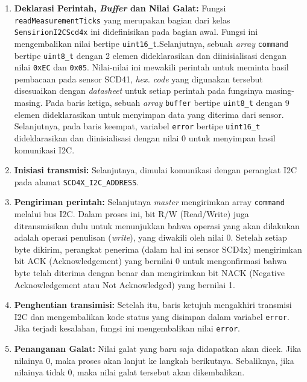         \begin{enumerate}
            \item \textbf{Deklarasi Perintah, \textit{Buffer }dan Nilai Galat:} Fungsi \texttt{readMeasurementTicks} yang merupakan bagian dari kelas  \texttt{SensirionI2CScd4x} ini didefinisikan pada bagian awal. Fungsi ini mengembalikan nilai bertipe \texttt{uint16\_t}.Selanjutnya, sebuah \textit{array} \texttt{command} bertipe \texttt{uint8\_t} dengan 2 elemen dideklarasikan dan diinisialisasi dengan nilai \texttt{0xEC} dan \texttt{0x05}. Nilai-nilai ini mewakili perintah untuk meminta hasil pembacaan pada sensor SCD41, \textit{hex. code} yang digunakan tersebut disesuaikan dengan \textit{datasheet} untuk setiap perintah pada fungsinya masing-masing. Pada baris ketiga, sebuah \textit{array} \texttt{buffer} bertipe \texttt{uint8\_t} dengan 9 elemen dideklarasikan untuk menyimpan data yang diterima dari sensor. Selanjutnya, pada baris keempat, variabel \texttt{error} bertipe \texttt{uint16\_t} dideklarasikan dan diinisialisasi dengan nilai 0 untuk menyimpan hasil komunikasi I2C.
            
            \item \textbf{Inisiasi transmisi:} Selanjutnya, dimulai komunikasi dengan perangkat I2C pada alamat \texttt{SCD4X\_I2C\_ADDRESS}. 
            
            \item \textbf{Pengiriman perintah:} Selanjutnya \textit{master} mengirimkan array \texttt{command} melalui bus I2C. Dalam proses ini, bit R/W (Read/Write) juga ditransmisikan dulu untuk menunjukkan bahwa operasi yang akan dilakukan adalah operasi penulisan (\textit{write}), yang diwakili oleh nilai 0. Setelah setiap byte dikirim, perangkat penerima (dalam hal ini sensor SCD4x) mengirimkan bit ACK (Acknowledgement) yang bernilai 0 untuk mengonfirmasi bahwa byte telah diterima dengan benar dan mengirimkan bit NACK (Negative Acknowledgement atau Not Acknowledged) yang bernilai 1. 
            
            \item \textbf{Penghentian transimisi:} Setelah itu, baris ketujuh mengakhiri transmisi I2C dan mengembalikan kode status yang disimpan dalam variabel \texttt{error}. Jika terjadi kesalahan, fungsi ini mengembalikan nilai \texttt{error}.

            \item \textbf{Penanganan Galat:} Nilai galat yang baru saja didapatkan akan dicek. Jika nilainya 0, maka proses akan lanjut ke langkah berikutnya. Sebaliknya, jika nilainya tidak 0, maka nilai galat tersebut akan dikembalikan. 
            

\end{enumerate}
